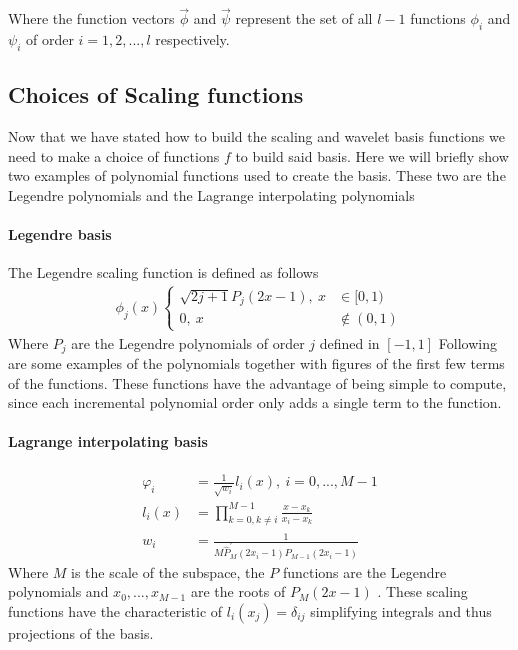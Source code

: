 \documentclass[../master_thesis.tex]{subfiles}
\begin{document}
Where the function vectors $\vec{\phi}$ and $\vec{\psi}$ represent the set of
all $l-1$ functions $\phi_i$ and $\psi_i$ of order $i = 1, 2, ..., l$ respectively.

\subsection{Choices of Scaling functions }
Now that we have stated how to build the scaling and wavelet basis functions
we need to make a choice of functions $f$ to build said basis.
Here we will briefly show two examples of polynomial functions used to create the
basis. These two are the Legendre polynomials and the Lagrange interpolating
polynomials \cite{Beylkin:MRA, Beylkin1999AdaptiveSO}
\paragraph{Legendre basis}
The Legendre scaling function is defined as follows
\begin{align}
  \phi_j(x)
  \begin{cases}
    \sqrt{2j+1} P_j(2x-1), \ x&\in [0,1)\\
    0,\ x&\notin (0, 1)
  \end{cases}
\end{align}
Where $P_j$ are the Legendre polynomials of order $j$ defined in $[-1, 1]$ \cite{Beylkin:MRA}
Following are some examples of the polynomials together with figures of the first few terms
of the functions. These functions have the advantage of being simple to compute,
since each incremental polynomial order only adds a single term to the function.

\paragraph{Lagrange interpolating basis}
  \begin{align}
    \varphi_i &= \frac{1}{\sqrt{w_i}}l_i(x), \ i = 0, ..., M-1\\
    l_i(x) &= \prod^{M-1}_{k = 0, k\neq i} \frac{x-x_k}{x_i-x_k} \\
    w_i &= \frac{1}{M\hat{P}^\prime_M(2x_i-1)P_{M-1}(2x_i-1)}
  \end{align}
Where $M$ is the scale of the subspace, the $P$ functions are the Legendre polynomials and
$x_0, ..., x_{M-1}$ are the roots of $P_M(2x-1)$ \cite{Beylkin:MRA}.
These scaling functions have the characteristic of $l_i(x_j)=\delta_{ij}$ simplifying
integrals and thus projections of the basis.
\end{document}
